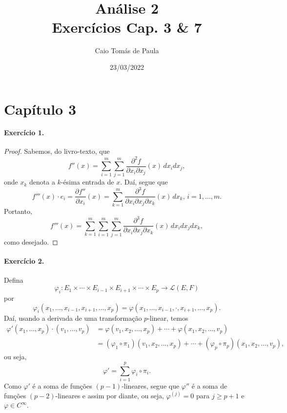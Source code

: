 \documentclass[12pt,a4paper]{article}
\title{\textbf{Análise 2}\\ Exercícios Cap. 3 \& 7}
\author{Caio Tomás de Paula}
\date{23/03/2022}
\begin{document}
\maketitle

\section*{Capítulo 3}

\paragraph{Exercício 1.}
%
\begin{proof}
    Sabemos, do livro-texto, que
    \begin{equation*}
        f''(x) = \sum_{i=1}^m\sum_{j=1}^m \frac{ \partial^2 f }
        {\partial x_i \partial x_j} (x) \, dx_idx_j,
    \end{equation*}
    onde $x_k$ denota a $k$-ésima entrada de $x$. Daí, segue que
    \begin{equation*}
        f'''(x)\cdot e_i = 
        \frac{ \partial f'' }{ \partial x_i } (x)
        = \sum_{k=1}^m \frac{ \partial^3 f }
        {\partial x_i \partial x_j \partial x_k} (x) \, dx_k, \, i=1,\dots,m.
    \end{equation*}
    Portanto,
    \begin{equation*}
        f'''(x) = \sum_{k=1}^m\sum_{i=1}^m\sum_{j=1}^m 
        \frac{ \partial^3 f }
        {\partial x_i \partial x_j \partial x_k} (x) \, dx_idx_jdx_k,
    \end{equation*}
    como desejado.
\end{proof}
%
\paragraph{Exercício 2.}
%
Defina
%
\begin{equation*}
    \varphi_i : 
    E_1 \times \cdots \times E_{i-1} \times E_{i+1} \times \cdots \times E_p \to
    \mathcal{L}(E,F)
\end{equation*}
%
por
%
\begin{equation*}
    \varphi_i(x_1, \dots, x_{i-1}, x_{i+1}, \dots, x_p) = 
    \varphi(x_1, \dots, x_{i-1}, \cdot, x_{i+1}, \dots, x_p).
\end{equation*}
%
Daí, usando a derivada de uma transformação $p$-linear, temos
%
\begin{align*}
    \varphi'(x_1, \dots, x_p)\cdot(v_1, \dots, v_p) &=
    \varphi(v_1, x_2, \dots, x_p) + \cdots + \varphi(x_1, x_2, \dots, v_p) \\
    &= (\varphi_1\circ\pi_1)(v_1, x_2, \dots, x_p) + \cdots +
    (\varphi_p\circ\pi_p)(x_1, x_2, \dots, v_p),
\end{align*}
%
ou seja,
%
\begin{equation*}
    \varphi' = \sum_{i=1}^p \varphi_i\circ\pi_i.
\end{equation*}
%
Como $\varphi'$ é a soma de funções $(p-1)$-lineares, segue que $\varphi''$
é a soma de funções $(p-2)$-lineares e assim por diante, ou seja, $\varphi^{(j)} = 0$
para $j\geq p+1$ e $\varphi\in C^{\infty}$.
%
\end{document}
